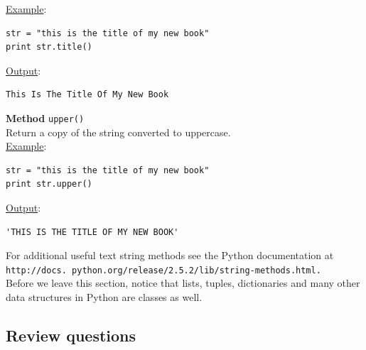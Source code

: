 \noindent
\underline{Example}:
\begin{verbatim}
str = "this is the title of my new book"
print str.title()
\end{verbatim}
\underline{Output}:
\begin{verbatim}
This Is The Title Of My New Book
\end{verbatim}
\vspace{4mm}

\noindent
{\bf Method} {\tt upper()}\\
Return a copy of the string converted to uppercase.\\

\noindent
\underline{Example}:
\begin{verbatim}
str = "this is the title of my new book"
print str.upper()
\end{verbatim}
\underline{Output}:
\begin{verbatim}
'THIS IS THE TITLE OF MY NEW BOOK'
\end{verbatim}
\vspace{4mm}

\noindent
For additional useful text string methods see the Python documentation at 
{\tt http://docs. python.org/release/2.5.2/lib/string-methods.html.} \\

\noindent
Before we
leave this section, notice that lists, tuples, dictionaries and many other 
data structures in Python are classes as well.

\subsection{Review questions}

